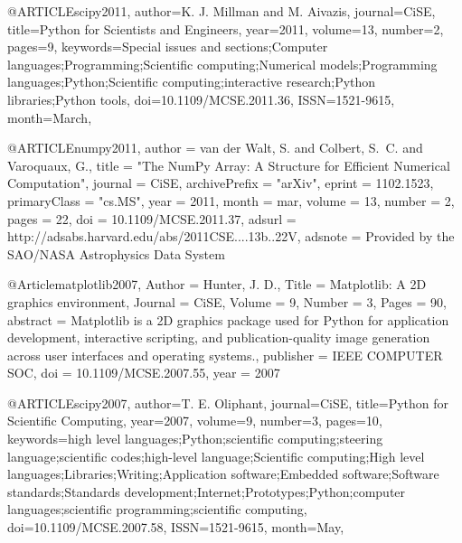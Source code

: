 @ARTICLE{scipy2011,
author={K. J. {Millman} and M. {Aivazis}},
journal={CiSE},
title={Python for Scientists and Engineers},
year={2011},
volume={13},
number={2},
pages={9},
keywords={Special issues and sections;Computer languages;Programming;Scientific computing;Numerical models;Programming languages;Python;Scientific computing;interactive research;Python libraries;Python tools},
doi={10.1109/MCSE.2011.36},
ISSN={1521-9615},
month={March},
}





@ARTICLE{numpy2011,
   author = {{van der Walt}, S. and {Colbert}, S.~C. and {Varoquaux}, G.},
    title = "{The NumPy Array: A Structure for Efficient Numerical Computation}",
  journal = {CiSE},
archivePrefix = "arXiv",
   eprint = {1102.1523},
 primaryClass = "cs.MS",
     year = 2011,
    month = mar,
   volume = 13,
   number = 2,
    pages = {22},
      doi = {10.1109/MCSE.2011.37},
   adsurl = {http://adsabs.harvard.edu/abs/2011CSE....13b..22V},
  adsnote = {Provided by the SAO/NASA Astrophysics Data System}
}





@Article{matplotlib2007,
  Author    = {Hunter, J. D.},
  Title     = {Matplotlib: A 2D graphics environment},
  Journal   = {CiSE},
  Volume    = {9},
  Number    = {3},
  Pages     = {90},
  abstract  = {Matplotlib is a 2D graphics package used for Python
  for application development, interactive scripting, and
  publication-quality image generation across user
  interfaces and operating systems.},
  publisher = {IEEE COMPUTER SOC},
  doi       = {10.1109/MCSE.2007.55},
  year      = 2007
}





@ARTICLE{scipy2007,
author={T. E. {Oliphant}},
journal={CiSE},
title={Python for Scientific Computing},
year={2007},
volume={9},
number={3},
pages={10},
keywords={high level languages;Python;scientific computing;steering language;scientific codes;high-level language;Scientific computing;High level languages;Libraries;Writing;Application software;Embedded software;Software standards;Standards development;Internet;Prototypes;Python;computer languages;scientific programming;scientific computing},
doi={10.1109/MCSE.2007.58},
ISSN={1521-9615},
month={May},
}
